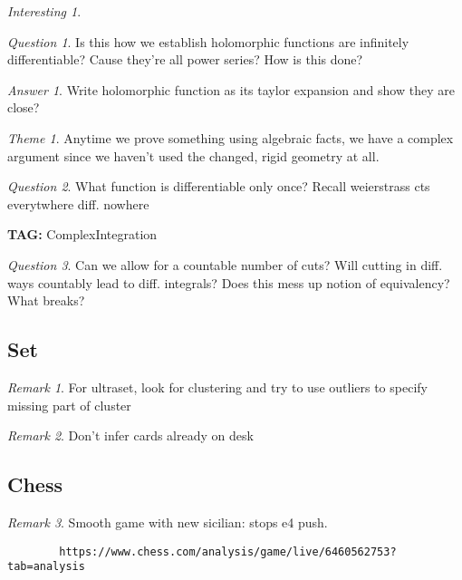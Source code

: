 \documentclass[11pt]{article}
\theoremstyle{remark}
\newtheorem{remark}{Remark}
\newtheorem{quest}{Question}
\newtheorem{ans}{Answer}
\newtheorem{interest}{Interesting}
\newtheorem{theme}{Theme}
\begin{document}
\begin{interest}
\begin{quest}
	Is this how we establish holomorphic functions are infinitely differentiable? Cause they're all power series? How is this done?
\end{quest}

\begin{ans}
	Write holomorphic function as its taylor expansion and show they are close?
\end{ans}

\begin{theme}
	Anytime we prove something using algebraic facts, we have a complex argument since we haven't used the changed, rigid geometry at all.
\end{theme}

\begin{quest}
	What function is differentiable only once? Recall weierstrass cts everytwhere diff. nowhere
\end{quest}

\textbf{TAG:} ComplexIntegration

\begin{quest}
	Can we allow for a countable number of cuts? Will cutting in diff. ways countably lead to diff. integrals? Does this mess up notion of equivalency? What breaks? 
\end{quest}

\subsection{Set}

\begin{remark}
	For ultraset, look for clustering and try to use outliers to specify missing part of cluster
\end{remark}

\begin{remark}
	Don't infer cards already on desk
\end{remark}

\subsection{Chess}

\begin{remark}
	Smooth game with new sicilian: stops e4 push.
	\begin{verbatim}
		https://www.chess.com/analysis/game/live/6460562753?tab=analysis
	\end{verbatim}
\end{remark}


\end{interest}
\end{document}
